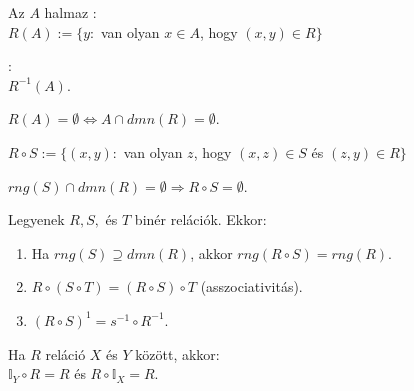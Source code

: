 \begin{frame}
\begin{tcolorbox}[title={Def.: Az $A$ halmaz képe, (ős)képe / inverz képe}]
Az $A$ halmaz :\\
$R(A) := \{ y :$ van olyan $x \in A$, hogy $(x, y) \in R \}$\\
\mmedskip

:\\
$R^{-1}(A)$.
\end{tcolorbox}

\begin{tcolorbox}[title={Ész}]
$R(A) = \emptyset \iff A \cap dmn(R) = \emptyset$.
\end{tcolorbox}

\begin{tcolorbox}[title={Def.: Az $S$ és $R$ binér relációk kompozíciója}]
$R \circ S := \{ (x, y) : $ van olyan $z$, hogy $(x, z) \in S$ és $(z, y) \in R \}$
\end{tcolorbox}

\begin{tcolorbox}[title={Ész}]
$rng(S) \cap dmn(R) = \emptyset \Rightarrow R \circ S = \emptyset$.
\end{tcolorbox}

\begin{tcolorbox}[title={Def.: Kompozíció tulajdonságai}]
Legyenek $R, S,$ és $T$ binér relációk. Ekkor:\\
\begin{enumerate}
\item Ha $rng(S) \supseteq dmn(R)$, akkor $rng(R \circ S) = rng(R)$.
\item $R \circ (S \circ T) = (R \circ S) \circ T$ (asszociativitás).
\item $(R \circ S)^{1} = s^{-1} \circ R^{-1}$.
\end{enumerate}

Ha $R$ reláció $X$ és $Y$ között, akkor:\\
$\mathbb{I}_Y \circ R = R$ és $R \circ \mathbb{I}_X = R$.
\end{tcolorbox}
\end{frame}

